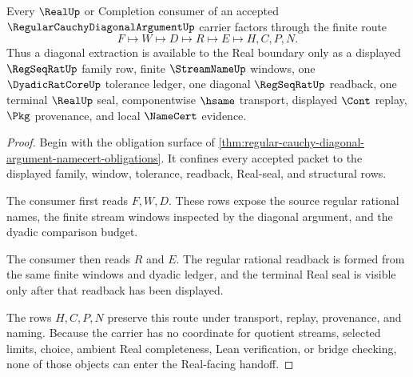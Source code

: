 \begin{theorem}
\label{thm:regular-cauchy-diagonal-argument-real-handoff}
Every $\RealUp$ or Completion consumer of an accepted $\RegularCauchyDiagonalArgumentUp$ carrier factors through the finite route
$$
F \longmapsto W \longmapsto D \longmapsto R \longmapsto E \longmapsto H,C,P,N .
$$
Thus a diagonal extraction is available to the Real boundary only as a displayed $\RegSeqRatUp$ family row, finite $\StreamNameUp$ windows, one $\DyadicRatCoreUp$ tolerance ledger, one diagonal $\RegSeqRatUp$ readback, one terminal $\RealUp$ seal, componentwise $\hsame$ transport, displayed $\Cont$ replay, $\Pkg$ provenance, and local $\NameCert$ evidence.
\end{theorem}
\begin{proof}
Begin with the obligation surface of \autoref{thm:regular-cauchy-diagonal-argument-namecert-obligations}. It confines every accepted packet to the displayed family, window, tolerance, readback, Real-seal, and structural rows.

The consumer first reads $F,W,D$. These rows expose the source regular rational names, the finite stream windows inspected by the diagonal argument, and the dyadic comparison budget.

The consumer then reads $R$ and $E$. The regular rational readback is formed from the same finite windows and dyadic ledger, and the terminal Real seal is visible only after that readback has been displayed.

The rows $H,C,P,N$ preserve this route under transport, replay, provenance, and naming. Because the carrier has no coordinate for quotient streams, selected limits, choice, ambient Real completeness, Lean verification, or bridge checking, none of those objects can enter the Real-facing handoff.
\end{proof}



